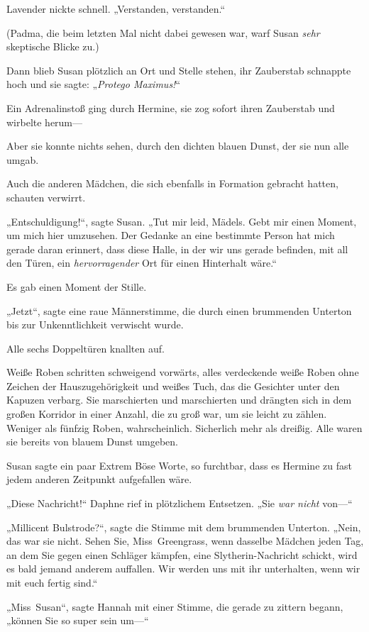 {Lavender nickte schnell. „Verstanden, verstanden.“

(Padma, die beim letzten Mal nicht dabei gewesen war, warf Susan \emph{sehr} skeptische Blicke zu.)

Dann blieb Susan plötzlich an Ort und Stelle stehen, ihr Zauberstab schnappte hoch und sie sagte: „\emph{Protego Maximus!}“

Ein Adrenalinstoß ging durch Hermine, sie zog sofort ihren Zauberstab und wirbelte herum—

Aber sie konnte nichts sehen, durch den dichten blauen Dunst, der sie nun alle umgab.

Auch die anderen Mädchen, die sich ebenfalls in Formation gebracht hatten, schauten verwirrt.

„Entschuldigung!“, sagte Susan. „Tut mir leid, Mädels. Gebt mir einen Moment, um mich hier umzusehen. Der Gedanke an eine bestimmte Person hat mich gerade daran erinnert, dass diese Halle, in der wir uns gerade befinden, mit all den Türen, ein \emph{hervorragender} Ort für einen Hinterhalt wäre.“

Es gab einen Moment der Stille.

„Jetzt“, sagte eine raue Männerstimme, die durch einen brummenden Unterton bis zur Unkenntlichkeit verwischt wurde.

Alle sechs Doppeltüren knallten auf.

Weiße Roben schritten schweigend vorwärts, alles verdeckende weiße Roben ohne Zeichen der Hauszugehörigkeit und weißes Tuch, das die Gesichter unter den Kapuzen verbarg. Sie marschierten und marschierten und drängten sich in dem großen Korridor in einer Anzahl, die zu groß war, um sie leicht zu zählen. Weniger als fünfzig Roben, wahrscheinlich. Sicherlich mehr als dreißig. Alle waren sie bereits von blauem Dunst umgeben.

Susan sagte ein paar Extrem Böse Worte, so furchtbar, dass es Hermine zu fast jedem anderen Zeitpunkt aufgefallen wäre.

„Diese Nachricht!“ Daphne rief in plötzlichem Entsetzen. „Sie \emph{war nicht} von—“

„Millicent Bulstrode?“, sagte die Stimme mit dem brummenden Unterton. „Nein, das war sie nicht. Sehen Sie, Miss~Greengrass, wenn dasselbe Mädchen jeden Tag, an dem Sie gegen einen Schläger kämpfen, eine Slytherin-Nachricht schickt, wird es bald jemand anderem auffallen. Wir werden uns mit ihr unterhalten, wenn wir mit euch fertig sind.“

„Miss~Susan“, sagte Hannah mit einer Stimme, die gerade zu zittern begann, „können Sie so super sein um—“

}

